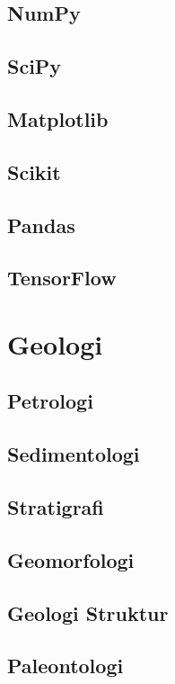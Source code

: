 \documentclass[11pt]{article}
\begin{document}
	\subsection{NumPy}
	\subsection{SciPy}
	\subsection{Matplotlib}
	\subsection{Scikit}
	\subsection{Pandas}
	\subsection{TensorFlow} \hfill\section{Geologi}
	\subsection{Petrologi}
		
	\subsection{Sedimentologi}
	\subsection{Stratigrafi}
	\subsection{Geomorfologi}
	\subsection{Geologi Struktur}
	\subsection{Paleontologi}
\end{document}
